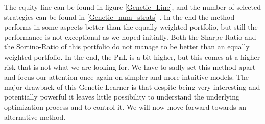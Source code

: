 The equity line can be found in figure \ref{Genetic_Line}, and the number of selected strategies can be found in \ref{Genetic_num_strats} .
In the end the method performs in some aspects better than the equally weighted portfolio, but still the performance is not exceptional as we hoped initially. Both the Sharpe-Ratio and the Sortino-Ratio of this portfolio do not manage to be better than an equally weighted portfolio. In the end, the PnL is a bit higher, but this comes at a higher risk that is not what we are looking for. We have to sadly set this method apart and focus our attention once again on simpler and more intuitive models. The major drawback of this Genetic Learner is that despite being very interesting and potentially powerful it leaves little possibility to understand the underlying optimization process and to control it. We will now move forward towards an alternative method.